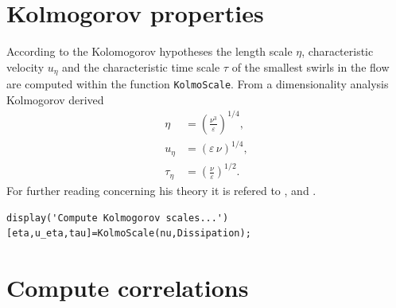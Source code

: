 \documentclass[preprint,12pt,ntfdMod]{elsarticle}
\begin{document}
\section{Kolmogorov properties}

\begin{par}

According to the Kolomogorov hypotheses the length scale $\eta$,
characteristic velocity $u_{\eta}$ and the characteristic time scale
$\tau$ of the smallest swirls in the flow are computed
within the function \lstinline!KolmoScale!. From a dimensionality
analysis Kolmogorov derived
  \begin{eqnarray}
      \eta&=\displaystyle\left(\frac{\nu^3}{\varepsilon}\right)^{1/4},\\
      u_{\eta}&=\left(\varepsilon\,\nu\right)^{1/4},\\
      \tau_{\eta}&=\displaystyle\left(\frac{\nu}{\varepsilon}\right)^{1/2}.
  \end{eqnarray}
For further reading concerning his theory it is refered to
\citet{Pope:2000tp}, \citet{Hinze:1975tb} and \citet{Tennekes:1972vb}.

\end{par} \vspace{1em}
\begin{verbatim}
display('Compute Kolmogorov scales...')
[eta,u_eta,tau]=KolmoScale(nu,Dissipation);
\end{verbatim}
\begin{par}



\end{par} \vspace{1em}


\section{Compute correlations}
\end{document}
